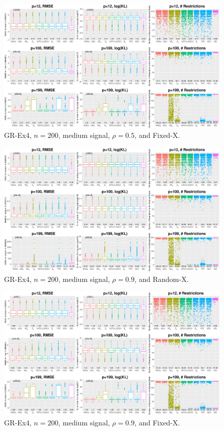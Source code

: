 \begin{figure}[!ht]
\centering
\includegraphics[width=\textwidth]{figures/supplement/fixedx_GR-Ex4_n200_msnr_rho05.eps}
\caption{GR-Ex4, $n=200$, medium signal, $\rho=0.5$, and Fixed-X.}
\end{figure}
\clearpage
\begin{figure}[!ht]
\centering
\includegraphics[width=\textwidth]{figures/supplement/randomx_GR-Ex4_n200_msnr_rho09.eps}
\caption{GR-Ex4, $n=200$, medium signal, $\rho=0.9$, and Random-X.}
\end{figure}
\begin{figure}[!ht]
\centering
\includegraphics[width=\textwidth]{figures/supplement/fixedx_GR-Ex4_n200_msnr_rho09.eps}
\caption{GR-Ex4, $n=200$, medium signal, $\rho=0.9$, and Fixed-X.}
\end{figure}

